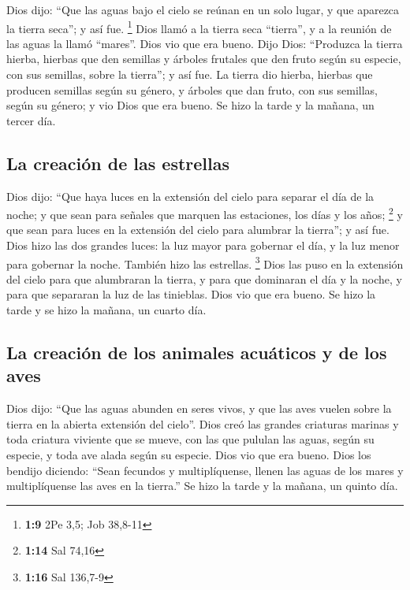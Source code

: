  Dios dijo: ``Que las aguas bajo el cielo se reúnan en un
solo lugar, y que aparezca la tierra seca''; y así fue. \footnote{\textbf{1:9}
  2Pe 3,5; Job 38,8-11}  Dios llamó a la tierra seca
``tierra'', y a la reunión de las aguas la llamó ``mares''. Dios vio que
era bueno.  Dijo Dios: ``Produzca la tierra hierba,
hierbas que den semillas y árboles frutales que den fruto según su
especie, con sus semillas, sobre la tierra''; y así fue. 
La tierra dio hierba, hierbas que producen semillas según su género, y
árboles que dan fruto, con sus semillas, según su género; y vio Dios que
era bueno.  Se hizo la tarde y la mañana, un tercer día.

\hypertarget{la-creaciuxf3n-de-las-estrellas}{%
\subsection{La creación de las
estrellas}\label{la-creaciuxf3n-de-las-estrellas}}

 Dios dijo: ``Que haya luces en la extensión del cielo
para separar el día de la noche; y que sean para señales que marquen las
estaciones, los días y los años; \footnote{\textbf{1:14} Sal 74,16}
 y que sean para luces en la extensión del cielo para
alumbrar la tierra''; y así fue.  Dios hizo las dos
grandes luces: la luz mayor para gobernar el día, y la luz menor para
gobernar la noche. También hizo las estrellas. \footnote{\textbf{1:16}
  Sal 136,7-9}  Dios las puso en la extensión del cielo
para que alumbraran la tierra,  y para que dominaran el
día y la noche, y para que separaran la luz de las tinieblas. Dios vio
que era bueno.  Se hizo la tarde y se hizo la mañana, un
cuarto día.

\hypertarget{la-creaciuxf3n-de-los-animales-acuuxe1ticos-y-de-los-aves}{%
\subsection{La creación de los animales acuáticos y de los
aves}\label{la-creaciuxf3n-de-los-animales-acuuxe1ticos-y-de-los-aves}}

 Dios dijo: ``Que las aguas abunden en seres vivos, y que
las aves vuelen sobre la tierra en la abierta extensión del cielo''.
 Dios creó las grandes criaturas marinas y toda criatura
viviente que se mueve, con las que pululan las aguas, según su especie,
y toda ave alada según su especie. Dios vio que era bueno.
 Dios los bendijo diciendo: ``Sean fecundos y
multiplíquense, llenen las aguas de los mares y multiplíquense las aves
en la tierra.''  Se hizo la tarde y la mañana, un quinto
día.

